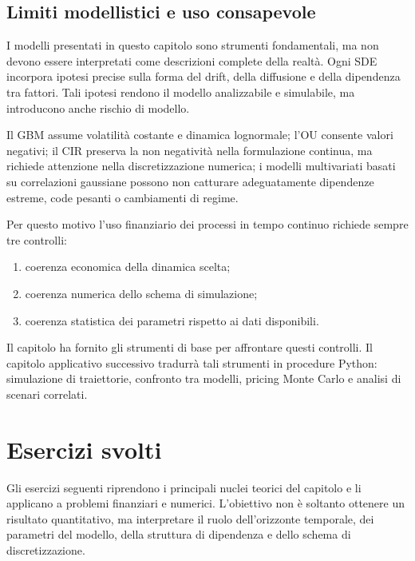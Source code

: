 \subsection*{Limiti modellistici e uso consapevole}

I modelli presentati in questo capitolo sono strumenti fondamentali, ma
non devono essere interpretati come descrizioni complete della realt\`{a}.
Ogni SDE incorpora ipotesi precise sulla forma del drift, della
diffusione e della dipendenza tra fattori. Tali ipotesi rendono il modello
analizzabile e simulabile, ma introducono anche rischio di modello.

Il GBM assume volatilit\`{a} costante e dinamica lognormale; l'OU consente
valori negativi; il CIR preserva la non negativit\`{a} nella formulazione
continua, ma richiede attenzione nella discretizzazione numerica; i
modelli multivariati basati su correlazioni gaussiane possono non
catturare adeguatamente dipendenze estreme, code pesanti o cambiamenti di
regime.

Per questo motivo l'uso finanziario dei processi in tempo continuo
richiede sempre tre controlli:

\begin{enumerate}
\item coerenza economica della dinamica scelta;
\item coerenza numerica dello schema di simulazione;
\item coerenza statistica dei parametri rispetto ai dati disponibili.
\end{enumerate}

Il capitolo ha fornito gli strumenti di base per affrontare questi
controlli. Il capitolo applicativo successivo tradurr\`{a} tali strumenti in
procedure Python: simulazione di traiettorie, confronto tra modelli,
pricing Monte Carlo e analisi di scenari correlati.

\section{Esercizi svolti}
\label{sec:cap06-esercizi-svolti}

Gli esercizi seguenti riprendono i principali nuclei teorici del
capitolo e li applicano a problemi finanziari e numerici. L'obiettivo
non \`{e} soltanto ottenere un risultato quantitativo, ma interpretare
il ruolo dell'orizzonte temporale, dei parametri del modello, della
struttura di dipendenza e dello schema di discretizzazione.


